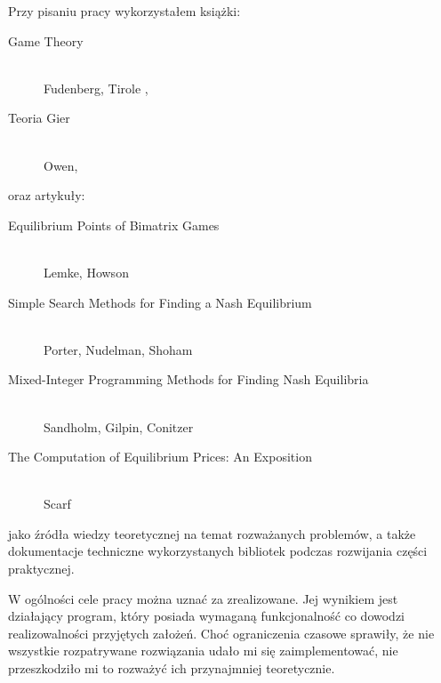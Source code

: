 \documentclass[polish]{standalone}
\begin{document}
Przy pisaniu pracy wykorzystałem książki:
\begin{description}
\item[Game Theory] \hfill \\ Fudenberg, Tirole \cite{FT-GT},
\item[Teoria Gier] \hfill \\ Owen, \cite{O-GT}
\end{description}
oraz artykuły:
\begin{description}
\item[Equilibrium Points of Bimatrix Games] \hfill \\ Lemke, Howson \cite{LH-NE}
\item[Simple Search Methods for Finding a Nash Equilibrium] \hfill \\ Porter, Nudelman, Shoham \cite{PNS-NE}
\item[Mixed-Integer Programming Methods for Finding Nash Equilibria] \hfill \\ Sandholm, Gilpin, Conitzer \cite{SCG-NE}
\item[The Computation of Equilibrium Prices: An Exposition] \hfill \\ Scarf \cite{SCARF-NR}
\end{description}
jako źródła wiedzy teoretycznej na temat rozważanych problemów, a także dokumentacje techniczne wykorzystanych bibliotek
podczas rozwijania części praktycznej.

W ogólności cele pracy można uznać za zrealizowane. Jej wynikiem jest działający program, który posiada wymaganą
funkcjonalność co dowodzi realizowalności przyjętych założeń. Choć ograniczenia czasowe sprawiły, że nie wszystkie
rozpatrywane rozwiązania udało mi się zaimplementować, nie przeszkodziło mi to rozważyć ich przynajmniej teoretycznie.
\end{document}
